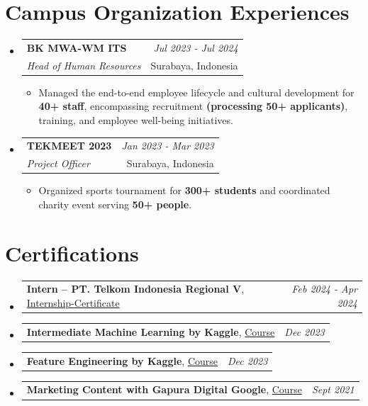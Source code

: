 \documentclass[a4paper,11pt]{article}
\makeatletter
\newcommand{\resumeItemMain}[1]{
  \item #1
}
\newcommand{\resumePOR}[3]{
\vspace{0.5mm}\item
    \begin{tabular*}{0.97\textwidth}[t]{l@{\extracolsep{\fill}}r}
        \textbf{#1}\hspace{0.3mm}#2 & \textit{\small{#3}} 
    \end{tabular*}
    \vspace{-2mm}
}
\newcommand{\resumeSubheading}[4]{
\vspace{0.5mm}\item
    \begin{tabular*}{0.98\textwidth}[t]{l@{\extracolsep{\fill}}r}
        \textbf{#1} & \textit{\footnotesize{#4}} \\
        \textit{\footnotesize{#3}} & \footnotesize{#2} \\
    \end{tabular*}
    \vspace{-2.4mm}
}
\newcommand{\resumeSubHeadingListStart}{\begin{itemize}[leftmargin=*,labelsep=0.1mm]}
\newcommand{\resumeItemListStart}{\begin{itemize}[leftmargin=*,labelsep=1mm,itemsep=0.5mm]}
\newcommand{\resumeSubHeadingListEnd}{\end{itemize}\vspace{2mm}}
\newcommand{\resumeItemListEnd}{\end{itemize}\vspace{-2mm}}
\makeatother
\begin{document}
\section{\textbf{Campus Organization Experiences}}
\vspace{-0.4mm}
\resumeSubHeadingListStart
\resumeSubheading
    {BK MWA-WM ITS}{Surabaya, Indonesia}
    {Head of Human Resources}{Jul 2023 - Jul 2024}
    \resumeItemListStart
        \resumeItemMain{Managed the end-to-end employee lifecycle and cultural development for \textbf{40+ staff}, encompassing recruitment \textbf{(processing 50+ applicants)}, training, and employee well-being initiatives.}
    \resumeItemListEnd
\resumeSubheading
    {TEKMEET 2023}{Surabaya, Indonesia}
    {Project Officer}{Jan 2023 - Mar 2023}
    \resumeItemListStart
        \resumeItemMain{Organized sports tournament for \textbf{300+ students} and coordinated charity event serving \textbf{50+ people}.}
    \resumeItemListEnd
\resumeSubHeadingListEnd
\vspace{-6mm}

\section{\textbf{Certifications}}
\vspace{-0.4mm}
\resumeSubHeadingListStart
\resumePOR
    {Intern – PT. Telkom Indonesia Regional V} %
    {, \href{https://drive.google.com/file/d/1-nwVQKJeIozZTcpPC5dgL05BCwOs9G52/view?usp=sharing}{Internship-Certificate}} %
    {Feb 2024 - Apr 2024} %
    \resumePOR
    {Intermediate Machine Learning by Kaggle} %
    {, \href{https://drive.google.com/file/d/10e7CyfwJeKg05ooD73OZsyuTeGxPadMf/view?usp=drive_link}{Course}} %
    {Dec 2023} %
    \resumePOR
    {Feature Engineering by Kaggle} %
    {, \href{https://drive.google.com/file/d/1_ewhJnumW4lnMLSV74YxCJEBM53T57YN/view?usp=sharing}{Course}} %
    {Dec 2023} %
    \resumePOR
        {Marketing Content with Gapura Digital Google} %
        {, \href{https://drive.google.com/file/d/14aI4HshF3DZK0YVp-r2IjDUmXmzBtc64/view?usp=sharing}{Course}} %
        {Sept 2021} %
\resumeSubHeadingListEnd
\end{document}
